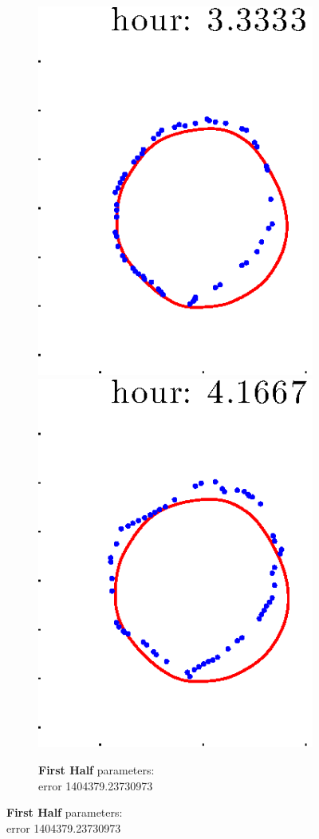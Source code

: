 \documentclass[12pt]{article}
\begin{document}
\begin{figure}[h!]
\begin{subfigure}[b]{.3\textwidth}
		\includegraphics[height=.15\textheight]{Pos14exp8/secondhalf/first5.eps}
		\includegraphics[height=.15\textheight]{Pos14exp8/secondhalf/first6.eps}
		\caption{\textbf{First Half} parameters: \\error 1404379.23730973}

\end{subfigure}
\end{figure}
\end{document}
